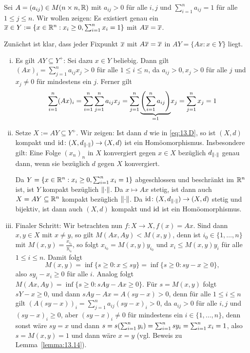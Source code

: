 \begin{beweis}
	Sei $A = (a_{ij}) \in M(n \times n,\mathbb{R})$ mit $a_{ij} > 0$ für alle $i,j$ und $\sum_{i=1}^{n} a_{ij} = 1$ für alle $1 \leq j \leq n$.
	Wir wollen zeigen:
	Es existiert genau ein $\overline{x} \in Y := \{x \in \mathbb{R}^n : x_i \geq 0, \sum_{i=1}^{n} x_i = 1\}$ mit $A\overline{x} = \overline{x}$.
	
	Zunächst ist klar, dass jeder Fixpunkt $\overline{x}$ mit $A\overline{x} = \overline{x}$ in $AY = \{Ax : x \in Y\}$ liegt.
	\begin{enumerate}[(i)]
		\item Es gilt $AY \subseteq Y^+$:
		Sei dazu $x \in Y$ beliebig.
		Dann gilt $(Ax)_i = \sum_{j=1}^{n} a_{ij} x_j > 0$ für alle $1 \leq i \leq n$, da $a_{ij} > 0, x_j > 0$ für alle $j$ und $x_j \neq 0$ für mindestens ein $j$.
		Ferner gilt
		\[
			\sum_{i=1}^{n} (Ax)_i = \sum_{i=1}^{n} \sum_{j=1}^{n} a_{ij} x_j = \sum_{j=1}^{n} {\underbrace{\left(\sum_{i=1}^{n} a_{ij}\right)}_{=1}} x_j = \sum_{j=1}^{n} x_j = 1
		\]
		\item Setze $X := AY \subseteq Y^+$.
		Wir zeigen:
		Ist dann $d$ wie in \eqref{eq:13.D}, so ist $(X,d)$ kompakt und $\operatorname{id}\colon (X,d_{\left\lVert\cdot\right\rVert}) \rightarrow (X,d)$ ist ein Homöomorphismus. 
		Insbesondere gilt:
		Eine Folge $(x_n)_n$ in $X$ konvergiert gegen $x \in X$ bezüglich $d_{\left\lVert\cdot\right\rVert}$ genau dann, wenn sie bezüglich $d$ gegen $X$ konvergiert.
		
		Da $Y = \{x \in \mathbb{R}^n : x_i \geq 0, \sum_{i=1}^{n} x_i = 1\}$ abgeschlossen und beschränkt im $\mathbb{R}^n$ ist, ist $Y$ kompakt bezüglich $\left\lVert\cdot\right\rVert$.
		Da $x \mapsto Ax$ stetig, ist dann auch $X = AY \subseteq \mathbb{R}^n$ kompakt bezüglich $\left\lVert\cdot\right\rVert$.
		Da $\operatorname{id}\colon (X,d_{\left\lVert\cdot\right\rVert}) \rightarrow (X,d)$ stetig und bijektiv, ist dann auch $(X,d)$ kompakt und $\operatorname{id}$ ist ein Homöomorphismus.
		\item Finaler Schritt:
		Wir betrachten nun $f \colon X \rightarrow X, f(x) = Ax$.
		Sind dann $x,y \in X$ mit $x \neq y$, so gilt $M(Ax,Ay) < M(x,y)$, denn ist $i_0 \in \{1,\dots,n\}$ mit $M(x,y) = \frac{x_{i_0}}{y_{i_0}}$, so folgt $x_{i_0} = M(x,y) y_{i_0}$ und $x_i \leq M(x,y) y_i$ für alle $1 \leq i \leq n$.
		Damit folgt
		\[
			M(x,y) = \inf \{s \geq 0 : x \leq sy\} = \inf \{s \geq 0 : sy-x \geq 0\},
		\]
		also $sy_i - x_i \geq 0$ für alle $i$.
		Analog folgt $M(Ax,Ay) = \inf\{s \geq 0 : sAy - Ax \geq 0\}$.
		Für $s = M(x,y)$ folgt $sY-x \geq 0$, und dann $sAy - Ax = A(sy-x) > 0$, denn für alle $1 \leq i \leq n$ gilt $(A(sy-x))_i = \sum_{j=1}^{n} a_{ij} (sy-x)_i > 0$, da $a_{ij} > 0$ für alle $i,j$ und $(sy-x)_i \geq 0$, aber $(sy-x)_i \neq 0$ für mindestens ein $i \in \{1,\dots,n\}$, denn sonst wäre $sy = x$ und dann $s = s\enb{\sum_{i=1}^{n} y_i} = \sum_{i=1}^{n} sy_i = \sum_{i=1}^{n} x_i = 1$, also $s = M(x,y) = 1$ und dann wäre $x=y$ (vgl. Beweis zu Lemma~\ref{lemma:13.14}).
		

\end{enumerate}
\end{beweis}
